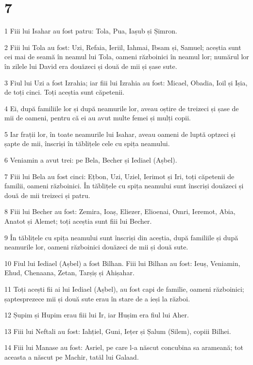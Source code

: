\chapter{7}

\par 1 Fiii lui Isahar au fost patru: Tola, Pua, Iașub și Șimron.
\par 2 Fiii lui Tola au fost: Uzi, Refaia, Ieriil, Iahmai, Ibsam și, Samuel; aceștia sunt cei mai de seamă în neamul lui Tola, oameni războinici în neamul lor; numărul lor în zilele lui David era douăzeci și două de mii și șase sute.
\par 3 Fiul lui Uzi a fost Izrahia; iar fiii lui Izrahia au fost: Micael, Obadia, Ioil și Ișia, de toți cinci. Toți aceștia sunt căpetenii.
\par 4 Ei, după familiile lor și după neamurile lor, aveau oștire de treizeci și șase de mii de oameni, pentru că ei au avut multe femei și mulți copii.
\par 5 Iar frații lor, în toate neamurile lui Isahar, aveau oameni de luptă optzeci și șapte de mii, înscriși în tăblițele cele cu spița neamului.
\par 6 Veniamin a avut trei: pe Bela, Becher și Iediael (Așbel).
\par 7 Fiii lui Bela au fost cinci: Ețbon, Uzi, Uziel, Ierimot și Iri, toți căpetenii de familii, oameni războinici. În tăblițele cu spița neamului sunt înscriși douăzeci și două de mii treizeci și patru.
\par 8 Fiii lui Becher au fost: Zemira, Ioaș, Eliezer, Elioenai, Omri, Ieremot, Abia, Anatot și Alemet; toți aceștia sunt fiii lui Becher.
\par 9 În tăblițele cu spița neamului sunt înscriși din aceștia, după familiile și după neamurile lor, oameni războinici douăzeci de mii și două sute.
\par 10 Fiul lui Iediael (Așbel) a fost Bilhan. Fiii lui Bilhan au fost: Ieuș, Veniamin, Ehud, Chenaana, Zetan, Tarșiș și Ahișahar.
\par 11 Toți acești fii ai lui Iediael (Așbel), au fost capi de familie, oameni războinici; șaptesprezece mii și două sute erau în stare de a ieși la război.
\par 12 Șupim și Hupim erau fiii lui Ir, iar Hușim era fiul lui Aher.
\par 13 Fiii lui Neftali au fost: Iahțiel, Guni, Iețer și Șalum (Silem), copiii Bilhei.
\par 14 Fiii lui Manase au fost: Asriel, pe care l-a născut concubina sa arameană; tot aceasta a născut pe Machir, tatăl lui Galaad.
